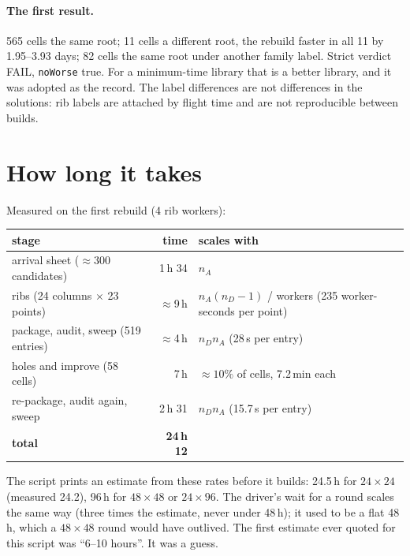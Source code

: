\documentclass[11pt]{article}
\renewcommand{\_}{\textunderscore\allowbreak}
\newcommand{\code}[1]{\texttt{#1}}
\begin{document}
\paragraph{The first result.} 565 cells the same root; 11 cells a different
root, the rebuild faster in all 11 by 1.95--3.93 days; 82 cells the same
root under another family label. Strict verdict FAIL, \code{noWorse} true.
For a minimum-time library that is a better library, and it was adopted as
the record. The label differences are not differences in the solutions: rib
labels are attached by flight time and are not reproducible between builds.

\section{How long it takes}

Measured on the first rebuild (4 rib workers):

\begin{center}\small
\begin{tabular}{@{}lrl@{}}
\toprule
stage & time & scales with \\
\midrule
arrival sheet ($\approx$300 candidates) & 1\,h 34 & $n_A$ \\
ribs (24 columns $\times$ 23 points) & $\approx$9\,h & $n_A(n_D-1)$ / workers \quad (235 worker-seconds per point)\\
package, audit, sweep (519 entries) & $\approx$4\,h & $n_Dn_A$ \quad (28\,s per entry)\\
holes and improve (58 cells) & 7\,h & $\approx10\%$ of cells, 7.2\,min each \\
re-package, audit again, sweep & 2\,h 31 & $n_Dn_A$ \quad (15.7\,s per entry)\\
\midrule
\textbf{total} & \textbf{24\,h 12} & \\
\bottomrule
\end{tabular}
\end{center}

\noindent The script prints an estimate from these rates before it builds:
24.5\,h for $24\times24$ (measured 24.2), 96\,h for $48\times48$ or
$24\times96$. The driver's wait for a round scales the same way (three
times the estimate, never under 48\,h); it used to be a flat 48\,h, which a
$48\times48$ round would have outlived. The first estimate ever quoted for
this script was ``6--10 hours''. It was a guess.

\end{document}
